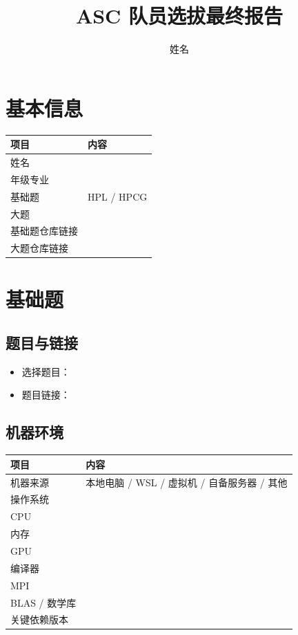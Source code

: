 \documentclass[UTF8]{ctexart}
\title{ASC 队员选拔最终报告}
\author{姓名}
\date{}
\begin{document}
\maketitle

\section{基本信息}

\begin{tabular}{ll}
\toprule
项目 & 内容 \\
\midrule
姓名 &  \\
年级专业 &  \\
基础题 & HPL / HPCG \\
大题 &  \\
基础题仓库链接 &  \\
大题仓库链接 &  \\
\bottomrule
\end{tabular}

\section{基础题}

\subsection{题目与链接}

\begin{itemize}
\item 选择题目：
\item 题目链接：
\end{itemize}

\subsection{机器环境}

\begin{tabular}{ll}
\toprule
项目 & 内容 \\
\midrule
机器来源 & 本地电脑 / WSL / 虚拟机 / 自备服务器 / 其他 \\
操作系统 &  \\
CPU &  \\
内存 &  \\
GPU &  \\
编译器 &  \\
MPI &  \\
BLAS / 数学库 &  \\
关键依赖版本 &  \\
\bottomrule
\end{tabular}
\end{document}
